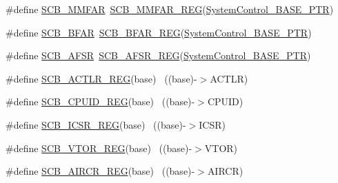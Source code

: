 \begin{DoxyCompactItemize}
\item 
\#define \hyperlink{group___s_c_b___register___accessor___macros_ga1fc21962567cb3e1c6ac552ed3068091}{S\+C\+B\+\_\+\+M\+M\+F\+AR}~\hyperlink{group___s_c_b___register___accessor___macros_gafbf4831267e040e9b4710ae9fb63c2c9}{S\+C\+B\+\_\+\+M\+M\+F\+A\+R\+\_\+\+R\+EG}(\hyperlink{group___s_c_b___peripheral_gaf22864785770f832103e904244e078cb}{System\+Control\+\_\+\+B\+A\+S\+E\+\_\+\+P\+TR})
\item 
\#define \hyperlink{group___s_c_b___register___accessor___macros_gaee532e1c3e3c27881a564b9a63f036cd}{S\+C\+B\+\_\+\+B\+F\+AR}~\hyperlink{group___s_c_b___register___accessor___macros_ga9932d2c86e9f7cd72b4fbca18863e757}{S\+C\+B\+\_\+\+B\+F\+A\+R\+\_\+\+R\+EG}(\hyperlink{group___s_c_b___peripheral_gaf22864785770f832103e904244e078cb}{System\+Control\+\_\+\+B\+A\+S\+E\+\_\+\+P\+TR})
\item 
\#define \hyperlink{group___s_c_b___register___accessor___macros_ga16a8b546ae510f0d470908e8ac913d11}{S\+C\+B\+\_\+\+A\+F\+SR}~\hyperlink{group___s_c_b___register___accessor___macros_ga9835a953f824d051f48ab361ba7ec70c}{S\+C\+B\+\_\+\+A\+F\+S\+R\+\_\+\+R\+EG}(\hyperlink{group___s_c_b___peripheral_gaf22864785770f832103e904244e078cb}{System\+Control\+\_\+\+B\+A\+S\+E\+\_\+\+P\+TR})
\item 
\#define \hyperlink{group___s_c_b___register___accessor___macros_gacc7b0065f69b9a0d772af30505d9d5e8}{S\+C\+B\+\_\+\+A\+C\+T\+L\+R\+\_\+\+R\+EG}(base)                                        ~((base)-\/$>$A\+C\+T\+LR)
\item 
\#define \hyperlink{group___s_c_b___register___accessor___macros_ga0fafcf57528f45b4ef5f3c5bfa627d55}{S\+C\+B\+\_\+\+C\+P\+U\+I\+D\+\_\+\+R\+EG}(base)                                        ~((base)-\/$>$C\+P\+U\+ID)
\item 
\#define \hyperlink{group___s_c_b___register___accessor___macros_ga32d507fb0a9ba80ad95e451fc93c942a}{S\+C\+B\+\_\+\+I\+C\+S\+R\+\_\+\+R\+EG}(base)                                          ~((base)-\/$>$I\+C\+SR)
\item 
\#define \hyperlink{group___s_c_b___register___accessor___macros_ga882585be47587da934194ffd169da43f}{S\+C\+B\+\_\+\+V\+T\+O\+R\+\_\+\+R\+EG}(base)                                          ~((base)-\/$>$V\+T\+OR)
\item 
\#define \hyperlink{group___s_c_b___register___accessor___macros_ga0510b76b89d5729f2ba9341356553f3e}{S\+C\+B\+\_\+\+A\+I\+R\+C\+R\+\_\+\+R\+EG}(base)                                        ~((base)-\/$>$A\+I\+R\+CR)
\item 

\end{DoxyCompactItemize}
